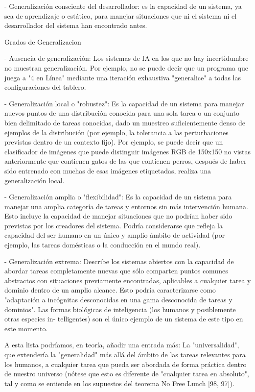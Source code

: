 - Generalización consciente del desarrollador: es la capacidad de un sistema, ya sea de aprendizaje o estático, para manejar situaciones que ni el sistema ni el desarrollador del sistema han encontrado antes.

Grados de Generalizacion

- Ausencia de generalización: Los sistemas de IA en los que no hay incertidumbre no muestran generalización. Por ejemplo, no se puede decir que un programa que juega a "4 en Línea" mediante una iteración exhaustiva "generalice" a todas las configuraciones del tablero.

- Generalización local o "robustez": Es la capacidad de un sistema para manejar nuevos puntos de una distribución conocida para una sola tarea o un conjunto bien delimitado de tareas conocidas, dado un muestreo suficientemente denso de ejemplos de la distribución (por ejemplo, la tolerancia a las perturbaciones previstas dentro de un contexto fijo). Por ejemplo, se puede decir que un clasificador de imágenes que puede distinguir imágenes RGB de 150x150 no vistas anteriormente que contienen gatos de las que contienen perros, después de haber sido entrenado con muchas de esas imágenes etiquetadas, realiza una generalización local. 

- Generalización amplia o "flexibilidad": Es la capacidad de un sistema para manejar una amplia categoría de tareas y entornos sin más intervención humana. Esto incluye la capacidad de manejar situaciones que no podrían haber sido previstas por los creadores del sistema. Podría considerarse que refleja la capacidad del ser humano en un único y amplio ámbito de actividad (por ejemplo, las tareas domésticas o la conducción en el mundo real).

- Generalización extrema: Describe los sistemas abiertos con la capacidad de abordar tareas completamente nuevas que sólo comparten puntos comunes abstractos con situaciones previamente encontradas, aplicables a cualquier tarea y dominio dentro de un amplio alcance. Esto podría caracterizarse como "adaptación a incógnitas desconocidas en una gama desconocida de tareas y dominios". Las formas biológicas de inteligencia (los humanos y posiblemente otras especies in- telligentes) son el único ejemplo de un sistema de este tipo en este momento.

A esta lista podríamos, en teoría, añadir una entrada más: La "universalidad", que extendería la "generalidad" más allá del ámbito de las tareas relevantes para los humanos, a cualquier tarea que pueda ser abordada de forma práctica dentro de nuestro universo (nótese que esto es diferente de "cualquier tarea en absoluto", tal y como se entiende en los supuestos del teorema No Free Lunch [98, 97]).



